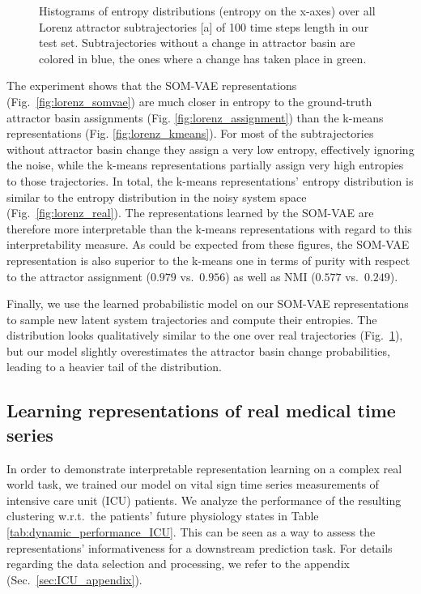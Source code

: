 \begin{figure}[h!]
    \caption{Histograms of entropy distributions (entropy on the x-axes) over all Lorenz attractor subtrajectories [a] of 100 time steps length in our test set. Subtrajectories without a change in attractor basin are colored in blue, the ones where a change has taken place in green.}
    \label{fig:lorenz}
\end{figure}

The experiment shows that the SOM-VAE representations (Fig.~\ref{fig:lorenz_somvae}) are much closer in entropy to the ground-truth attractor basin assignments (Fig. \ref{fig:lorenz_assignment}) than the k-means representations (Fig. \ref{fig:lorenz_kmeans}).
For most of the subtrajectories without attractor basin change they assign a very low entropy, effectively ignoring the noise, while the k-means representations partially assign very high entropies to those trajectories.
In total, the k-means representations' entropy distribution is similar to the entropy distribution in the noisy system space (Fig.~\ref{fig:lorenz_real}).
The representations learned by the SOM-VAE are therefore more interpretable than the k-means representations with regard to this interpretability measure.
As could be expected from these figures, the SOM-VAE representation is also superior to the k-means one in terms of purity with respect to the attractor assignment ($0.979$ vs.\ $0.956$) as well as NMI ($0.577$ vs.\ $0.249$).

Finally, we use the learned probabilistic model on our SOM-VAE representations to sample new latent system trajectories and compute their entropies.
The distribution looks qualitatively similar to the one over real trajectories (Fig.\ \ref{fig:lorenz}), but our model slightly overestimates the attractor basin change probabilities, leading to a heavier tail of the distribution.

\FloatBarrier

\subsection{Learning representations of real medical time series}


In order to demonstrate interpretable representation learning on a complex real world task, we trained our model on vital sign time series measurements of intensive care unit (ICU) patients.
We analyze the performance of the resulting clustering w.r.t.\ the patients' future physiology states in Table \ref{tab:dynamic_performance_ICU}.
This can be seen as a way to assess the representations' informativeness for a downstream prediction task.
For details regarding the data selection and processing, we refer to the appendix (Sec.\ \ref{sec:ICU_appendix}).

